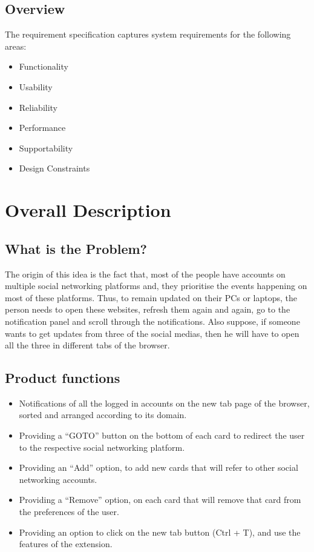\documentclass[12pt]{article}
\begin{document}
\subsection{Overview}
The requirement specification captures system requirements for the
following areas:
\begin{itemize}
    \item Functionality
    \item Usability
    \item Reliability
    \item Performance
    \item Supportability
    \item Design Constraints
 
\end{itemize}

\section{Overall Description}

\subsection{What is the Problem?}
The origin of this idea is the fact that, most of the people have accounts
on multiple social networking platforms and, they prioritise the events
happening on most of these platforms. Thus, to remain updated on
their PCs or laptops, the person needs to open these websites, refresh
them again and again, go to the notification panel and scroll through the
notifications. Also suppose, if someone wants to get updates from three
of the social medias, then he will have to open all the three in different
tabs of the browser.

\subsection{Product functions}
\begin{itemize}
    \item Notifications of all the logged in accounts on the new tab page of
the browser, sorted and arranged according to its domain.
 
    \item   Providing a “GOTO” button on the bottom of each card to redirect
the user to the respective social networking platform.
 
    \item Providing an “Add” option, to add new cards that will refer to
other social networking accounts. 

\item Providing a “Remove” option, on each card that will remove that
card from the preferences of the user.
\item Providing an option to click on the new tab button (Ctrl + T), and
use the features of the extension.
\end{itemize}
\end{document}
